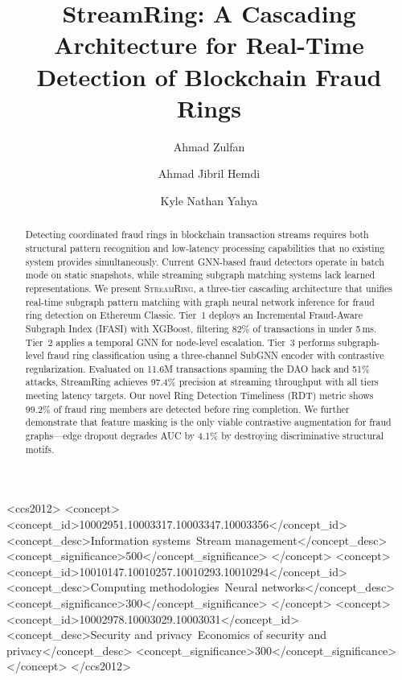 \documentclass[sigconf, anonymous, review]{acmart}
\begin{document}
\title{StreamRing: A Cascading Architecture for Real-Time Detection of Blockchain Fraud Rings}

\author{Ahmad Zulfan}

\author{Ahmad Jibril Hemdi}

\author{Kyle Nathan Yahya}

\renewcommand{\shortauthors}{Zulfan et al.}

\begin{abstract}
Detecting coordinated fraud rings in blockchain transaction streams requires both structural pattern recognition and low-latency processing capabilities that no existing system provides simultaneously. Current GNN-based fraud detectors operate in batch mode on static snapshots, while streaming subgraph matching systems lack learned representations. We present \textsc{StreamRing}, a three-tier cascading architecture that unifies real-time subgraph pattern matching with graph neural network inference for fraud ring detection on Ethereum Classic. Tier~1 deploys an Incremental Fraud-Aware Subgraph Index (IFASI) with XGBoost, filtering 82\% of transactions in under 5\,ms. Tier~2 applies a temporal GNN for node-level escalation. Tier~3 performs subgraph-level fraud ring classification using a three-channel SubGNN encoder with contrastive regularization. Evaluated on 11.6M transactions spanning the DAO hack and 51\% attacks, StreamRing achieves 97.4\% precision at streaming throughput with all tiers meeting latency targets. Our novel Ring Detection Timeliness (RDT) metric shows 99.2\% of fraud ring members are detected before ring completion. We further demonstrate that feature masking is the only viable contrastive augmentation for fraud graphs---edge dropout degrades AUC by 4.1\% by destroying discriminative structural motifs.
\end{abstract}

\begin{CCSXML}
<ccs2012>
   <concept>
       <concept_id>10002951.10003317.10003347.10003356</concept_id>
       <concept_desc>Information systems~Stream management</concept_desc>
       <concept_significance>500</concept_significance>
   </concept>
   <concept>
       <concept_id>10010147.10010257.10010293.10010294</concept_id>
       <concept_desc>Computing methodologies~Neural networks</concept_desc>
       <concept_significance>300</concept_significance>
   </concept>
   <concept>
       <concept_id>10002978.10003029.10003031</concept_id>
       <concept_desc>Security and privacy~Economics of security and privacy</concept_desc>
       <concept_significance>300</concept_significance>
   </concept>
</ccs2012>
\end{CCSXML}
\end{document}
